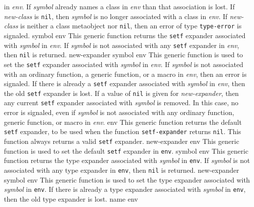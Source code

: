 in \textit{env}.  If \textit{symbol} already names a class
in \textit{env} than that association is lost.
\vskip -0.02cm
If \textit{new-class} is \texttt{nil}, then \textit{symbol} is no
longer associated with a class in \textit{env}.
\vskip -0.02cm
If \textit{new-class} is neither a class metaobject nor \texttt{nil},
then an error of type \texttt{type-error} is signaled.
\vskip -0.02cm
 {symbol env}
\vskip -0.2cm
This generic function returns the \texttt{setf} expander associated with
\textit{symbol} in \textit{env}.  If \textit{symbol} is not associated
with any \texttt{setf} expander in \textit{env}, then \texttt{nil} is returned.
\vskip -0.02cm
 {new-expander symbol env}
\vskip -0.2cm
This generic function is used to set the \texttt{setf} expander associated
with \textit{symbol} in \textit{env}.
\vskip -0.02cm
If \textit{symbol} is not associated with an ordinary function, a generic
function, or a macro in \textit{env}, then an error is signaled.
\vskip -0.02cm
If there is already a \texttt{setf} expander associated with \textit{symbol} in
\textit{env}, then the old \texttt{setf} expander is lost.
\vskip -0.02cm
If a value of \texttt{nil} is given for \textit{new-expander}, then
any current \texttt{setf} expander associated with \textit{symbol} is removed.
In this case, no error is signaled, even if \textit{symbol} is not
associated with any ordinary function, generic function, or macro
in \textit{env}.
\vskip -0.02cm
 {env}
\vskip -0.2cm
This generic function returns the default \texttt{setf} expander, to
be used when the function \texttt{setf-expander} returns \texttt{nil}.
This function always returns a valid \texttt{setf} expander.
\vskip -0.02cm
 {new-expander env}
\vskip -0.2cm
This generic function is used to set the default \texttt{setf}
expander in \texttt{env}.
\vskip -0.02cm
 {symbol env}
\vskip -0.2cm
This generic function returns the type expander associated with
\textit{symbol} in \texttt{env}.  If \textit{symbol} is not associated
with any type expander in \texttt{env}, then \texttt{nil} is returned.
\vskip -0.02cm
 {new-expander symbol env}
\vskip -0.2cm
This generic function is used to set the type expander associated
with \textit{symbol} in \texttt{env}.
\vskip -0.02cm
If there is already a type expander associated with \textit{symbol} in
\texttt{env}, then the old type expander is lost.
\vskip -0.02cm
 {name env}
